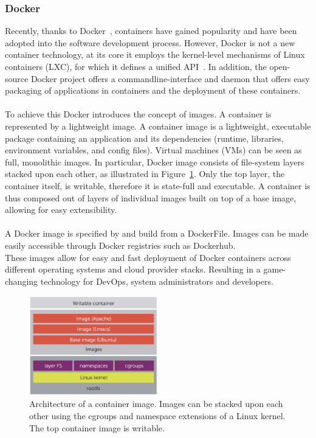 \subsubsection{Docker}
Recently, thanks to Docker~\cite{dockersite}, containers have gained popularity and have been adopted into the software development process. However, Docker is not a new container technology, at its core it employs the kernel-level mechanisms of Linux containers (LXC), for which it defines a unified API~\cite{merkel2014docker}. In addition, the open-source Docker project offers a commandline-interface and daemon that offers easy packaging of applications in containers and the deployment of these containers.\\\\
To achieve this Docker introduces the concept of images. A container is represented by a lightweight image. A container image is a lightweight, executable package containing an application and its dependencies (runtime, libraries, environment variables, and config files). Virtual machines (VMs) can be seen as full, monolithic images. In particular,  Docker image consists of file-system layers stacked upon each other, as illustrated in Figure~\ref{docker-layers}. Only the top layer, the container itself, is writable, therefore it is state-full and executable. A container is thus composed out of layers of individual images built on top of a base image, allowing for easy extensibility.~\cite{pahl2015containerization} \\\\
A Docker image is specified by and build from a DockerFile. Images can be made easily accessible through Docker registries such as Dockerhub.\\
These images allow for easy and fast deployment of Docker containers across different operating systems and cloud provider stacks. Resulting in a game-changing technology for DevOps, system administrators and developers.
\begin{figure}[H]
\caption{Architecture of a container image. Images can be stacked upon each other using the cgroups and namespace extensions of a Linux kernel. The top container image is writable.~\cite{pahl2015containerization} \label{docker-layers}}
\centering
\includegraphics[width=0.5\textwidth]{chapter-background/docker-layers.png}
\end{figure}

